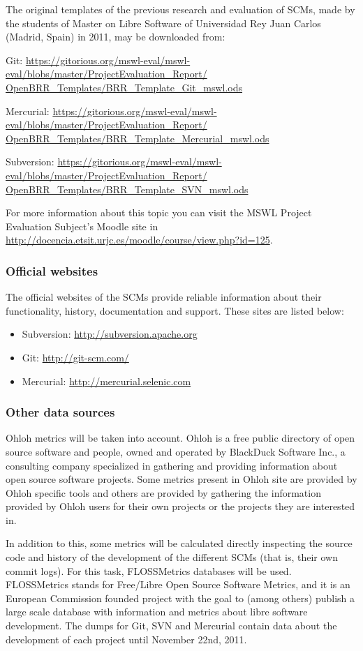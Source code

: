 \documentclass[a4paper,10pt]{article}
\begin{document}
The original templates of the previous research and evaluation of SCMs, made by
the students of Master on Libre Software of Universidad Rey Juan Carlos
(Madrid, Spain) in 2011, may be downloaded from:

Git: \url{
https://gitorious.org/mswl-eval/mswl-eval/blobs/master/ProjectEvaluation_Report/
OpenBRR_Templates/BRR_Template_Git_mswl.ods}


Mercurial: \url{
https://gitorious.org/mswl-eval/mswl-eval/blobs/master/ProjectEvaluation_Report/
OpenBRR_Templates/BRR_Template_Mercurial_mswl.ods}


Subversion: \url{
https://gitorious.org/mswl-eval/mswl-eval/blobs/master/ProjectEvaluation_Report/
OpenBRR_Templates/BRR_Template_SVN_mswl.ods}

For more information about this topic you can visit the MSWL Project Evaluation
Subject's Moodle site in
\url{http://docencia.etsit.urjc.es/moodle/course/view.php?id=125}.

\subsubsection{Official websites}
The official websites of the SCMs provide reliable information about their
functionality, history, documentation and support. These sites are listed below:
\begin{itemize}
 \item Subversion: \url{http://subversion.apache.org}
 \item Git: \url{http://git-scm.com/}
 \item Mercurial: \url{http://mercurial.selenic.com}
\end{itemize}

\subsubsection{Other data sources}
Ohloh metrics will be taken into account. Ohloh\cite{Ohloh} is a free public
directory of open source software and people, owned and operated by BlackDuck
Software Inc., a consulting company specialized in gathering and providing
information about open source software projects. Some metrics present in Ohloh
site are provided by Ohloh specific tools and others are provided by gathering
the information provided by Ohloh users for their own projects or the projects
they are interested in.

In addition to this, some metrics will be calculated directly inspecting the
source code and history of the development of the different SCMs (that is, their
own commit logs). For this task, FLOSSMetrics databases will be used.
FLOSSMetrics\cite{FLOSSMetrics} stands for Free/Libre Open Source Software
Metrics, and it is an European Commission founded project with the goal to
(among
others) publish a large scale database with information and metrics about libre
software development. The dumps for Git, SVN and Mercurial contain data about
the development of each project until November 22nd, 2011.
\end{document}
